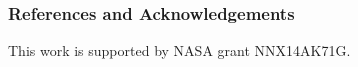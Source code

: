 \documentclass[landscape,xcolor={table},10pt]{beamer}
\begin{document}
\begin{frame}
\begin{columns}[T]
\begin{column}{.49\textwidth}
		\end{column}%
		\end{columns}

	\end{frame}
	
	\begin{frame}
		\frametitle{References and Acknowledgements}
		
		
		
		
		This work is supported by NASA grant NNX14AK71G.
	\end{frame}
	
\end{document}
